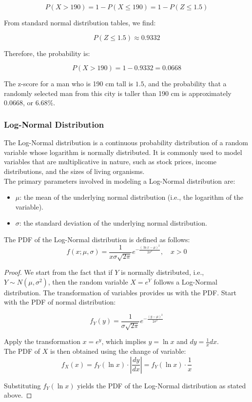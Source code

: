 \begin{example}
\[
P(X > 190) = 1 - P(X \leq 190) = 1 - P(Z \leq 1.5)
\]

From standard normal distribution tables, we find:

\[
P(Z \leq 1.5) \approx 0.9332
\]

Therefore, the probability is:

\[
P(X > 190) = 1 - 0.9332 = 0.0668
\]

The z-score for a man who is 190 cm tall is \(1.5\), and the probability that a randomly selected man from this city is taller than 190 cm is approximately \(0.0668\), or \(6.68\%\).

\end{example}

\subsubsection{Log-Normal Distribution}

The Log-Normal distribution is a continuous probability distribution of a random variable whose logarithm is normally distributed. It is commonly used to model variables that are multiplicative in nature, such as stock prices, income distributions, and the sizes of living organisms. \\

The primary parameters involved in modeling a Log-Normal distribution are:
\begin{itemize}
    \item $\mu$: the mean of the underlying normal distribution (i.e., the logarithm of the variable).
    \item $\sigma$: the standard deviation of the underlying normal distribution.
\end{itemize}

\begin{definition}
    The PDF of the Log-Normal distribution is defined as follows:
\[
f(x; \mu, \sigma) = \frac{1}{x \sigma \sqrt{2\pi}} e^{-\frac{(\ln x - \mu)^2}{2\sigma^2}}, \quad x > 0
\]
\end{definition}

\begin{proof}
    We start from the fact that if \( Y \) is normally distributed, i.e., \( Y \sim N(\mu, \sigma^2) \), then the random variable \( X = e^Y \) follows a Log-Normal distribution. The transformation of variables provides us with the PDF. Start with the PDF of normal distribution:

    \[
f_Y(y) = \frac{1}{\sigma \sqrt{2\pi}} e^{-\frac{(y - \mu)^2}{2\sigma^2}}
\]

Apply the transformation \( x = e^y \), which implies \( y = \ln x \) and \( dy = \frac{1}{x} dx \).\\

The PDF of \( X \) is then obtained using the change of variable:
\[
f_X(x) = f_Y(\ln x) \cdot \left| \frac{dy}{dx} \right| = f_Y(\ln x) \cdot \frac{1}{x}
\]

Substituting \( f_Y(\ln x) \) yields the PDF of the Log-Normal distribution as stated above.
\end{proof}

